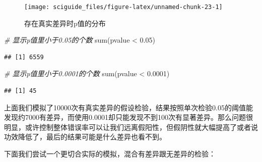 \documentclass[]{tufte-book}
\newenvironment{Shaded}{}{}
\newcommand{\CommentTok}[1]{\textcolor[rgb]{0.38,0.63,0.69}{\textit{#1}}}
\newcommand{\FloatTok}[1]{\textcolor[rgb]{0.25,0.63,0.44}{#1}}
\newcommand{\FunctionTok}[1]{\textcolor[rgb]{0.02,0.16,0.49}{#1}}
\newcommand{\NormalTok}[1]{#1}
\newcommand{\SpecialCharTok}[1]{\textcolor[rgb]{0.25,0.44,0.63}{#1}}
\begin{document}
\begin{figure}
\texttt{[image: sciguide\_files/figure-latex/unnamed-chunk-23-1]} \caption[存在真实差异时p值的分布]{存在真实差异时p值的分布}\label{fig:unnamed-chunk-23}
\end{figure}

\begin{Shaded}
\begin{Highlighting}[]
\CommentTok{\# 显示p值里小于0.05的个数}
\FunctionTok{sum}\NormalTok{(pvalue }\SpecialCharTok{\textless{}} \FloatTok{0.05}\NormalTok{)}
\end{Highlighting}
\end{Shaded}

\begin{verbatim}
## [1] 6559
\end{verbatim}

\begin{Shaded}
\begin{Highlighting}[]
\CommentTok{\# 显示p值里小于0.0001的个数}
\FunctionTok{sum}\NormalTok{(pvalue }\SpecialCharTok{\textless{}} \FloatTok{0.0001}\NormalTok{)}
\end{Highlighting}
\end{Shaded}

\begin{verbatim}
## [1] 45
\end{verbatim}

上面我们模拟了10000次有真实差异的假设检验，结果按照单次检验0.05的阈值能发现约7000有差异，而使用0.0001却只能发现不到100次有显著差异。那么问题很明显，或许控制整体错误率可以让我们远离假阳性，但假阴性就大幅提高了或者说功效降低了，最后的结果可能是什么差异也看不到。

下面我们尝试一个更切合实际的模拟，混合有差异跟无差异的检验：
\end{document}
